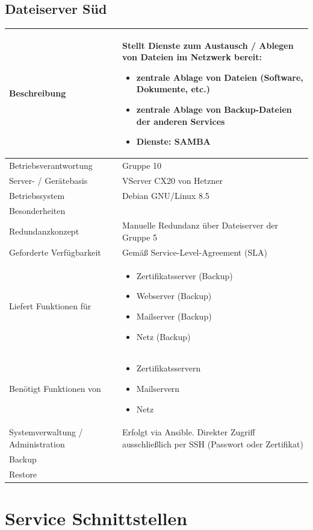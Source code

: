 \documentclass[]{article}
\begin{document}
\newpage

\subsection{Dateiserver Süd}\label{dateiserver-suxfcd}

\begin{longtable}{l|p{8cm}}
\toprule
Beschreibung & Stellt Dienste zum Austausch / Ablegen von Dateien im
Netzwerk bereit:

\begin{itemize}
\item
  zentrale Ablage von Dateien (Software, Dokumente, etc.)
\item
  zentrale Ablage von Backup-Dateien der anderen Services
\item
  Dienste: SAMBA
\end{itemize}\tabularnewline
\midrule
Betriebsverantwortung & Gruppe 10\tabularnewline
Server- / Gerätebasis & VServer CX20 von Hetzner\tabularnewline
Betriebssystem & Debian GNU/Linux 8.5\tabularnewline
Besonderheiten &\tabularnewline
Redundanzkonzept & Manuelle Redundanz über Dateiserver der Gruppe
5\tabularnewline
Geforderte Verfügbarkeit & Gemäß Service-Level-Agreement (SLA)\tabularnewline
Liefert Funktionen für & \begin{itemize}
\item
  Zertifikatsserver (Backup)
\item
  Webserver (Backup)
\item
  Mailserver (Backup)
\item
  Netz (Backup)
\end{itemize}\tabularnewline
Benötigt Funktionen von & \begin{itemize}
\item
  Zertifikatsservern
\item
  Mailservern
\item
  Netz
\end{itemize}\tabularnewline
Systemverwaltung / Administration & Erfolgt via Ansible. Direkter Zugriff ausschließlich per SSH (Passwort oder Zertifikat)\tabularnewline
Backup &\tabularnewline
Restore &\tabularnewline
\bottomrule
\end{longtable}

\newpage

\section{Service Schnittstellen}\label{service-schnittstellen}
\end{document}
